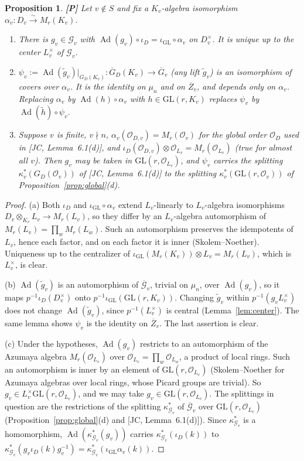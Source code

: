 \documentclass[12pt]{article}
\newcommand{\ov}[1]{\overline{#1}}
\newcommand{\cO}{\mathcal{O}}
\newcommand{\Ad}{\operatorname{Ad}}
\newcommand{\GL}{\mathrm{GL}}
\newcommand{\Gb}{\ov{G}}
\newcommand{\Zb}{\ov{Z}}
\newcommand{\GDb}{\ov{G}_D}
\newcommand{\ks}{\kappa^{*}}
\newcommand{\cG}{\mathcal{G}}
\newcommand{\cGb}{\ov{\mathcal{G}}}
\newcommand{\iD}{\iota_D}
\newcommand{\iG}{\iota_{\GL}}
\newcommand{\Pv}{\textbf{[P]}}
\theoremstyle{plain}
\newtheorem{proposition}[theorem]{Proposition}
\theoremstyle{definition}
\begin{document}
\begin{proposition}\label{prop:outsideS}\Pv
Let $v\notin S$ and fix a $K_v$-algebra isomorphism $\alpha_v:D_v\xrightarrow{\sim}M_r(K_v)$.
\begin{enumerate}[label=(\alph*)]
\item There is $g_v\in\cG_v$ with $\Ad(g_v)\circ\iD=\iG\circ\alpha_v$ on $D_v^\times$. It is unique up to the center $L_v^\times$ of $\cG_v$.
\item $\psi_v:=\Ad(\tilde g_v)|_{\GDb(K_v)}:\GDb(K_v)\to\Gb_v$ (any lift $\tilde g_v$) is an isomorphism of covers over $\alpha_v$. It is the identity on $\mu_n$ and on $\Zb_v$, and depends only on $\alpha_v$. Replacing $\alpha_v$ by $\Ad(h)\circ\alpha_v$ with $h\in\GL(r,K_v)$ replaces $\psi_v$ by $\Ad(\tilde h)\circ\psi_v$.
\item Suppose $v$ is finite, $v\nmid n$, $\alpha_v(\cO_{D,v})=M_r(\cO_v)$ for the global order $\cO_D$ used in [JC, Lemma~6.1(d)], and $\iD(\cO_{D,v})\otimes\cO_{L_v}=M_r(\cO_{L_v})$ (true for almost all $v$). Then $g_v$ may be taken in $\GL(r,\cO_{L_v})$, and $\psi_v$ carries the splitting $\ks_v(G_D(\cO_v))$ of [JC, Lemma~6.1(d)] to the splitting $\ks_v(\GL(r,\cO_v))$ of Proposition~\ref{prop:global}(d).
\end{enumerate}
\end{proposition}
\begin{proof}
(a) Both $\iD$ and $\iG\circ\alpha_v$ extend $L_v$-linearly to $L_v$-algebra isomorphisms $D_v\otimes_{K_v}L_v\to M_r(L_v)$, so they differ by an $L_v$-algebra automorphism of $M_r(L_v)=\prod_wM_r(L_w)$. Such an automorphism preserves the idempotents of $L_v$, hence each factor, and on each factor it is inner (Skolem--Noether). Uniqueness up to the centralizer of $\iG(M_r(K_v))\otimes L_v=M_r(L_v)$, which is $L_v^\times$, is clear.

(b) $\Ad(\tilde g_v)$ is an automorphism of $\cGb_v$, trivial on $\mu_n$, over $\Ad(g_v)$, so it maps $p^{-1}\iD(D_v^\times)$ onto $p^{-1}\iG(\GL(r,K_v))$. Changing $\tilde g_v$ within $p^{-1}(g_vL_v^\times)$ does not change $\Ad(\tilde g_v)$, since $p^{-1}(L_v^\times)$ is central (Lemma~\ref{lem:center}). The same lemma shows $\psi_v$ is the identity on $\Zb_v$. The last assertion is clear.

(c) Under the hypotheses, $\Ad(g_v)$ restricts to an automorphism of the Azumaya algebra $M_r(\cO_{L_v})$ over $\cO_{L_v}=\prod_w\cO_{L_w}$, a product of local rings. Such an automorphism is inner by an element of $\GL(r,\cO_{L_v})$ (Skolem--Noether for Azumaya algebras over local rings, whose Picard groups are trivial). So $g_v\in L_v^\times\GL(r,\cO_{L_v})$, and we may take $g_v\in\GL(r,\cO_{L_v})$. The splittings in question are the restrictions of the splitting $\ks_{\cG_v}$ of $\cGb_v$ over $\GL(r,\cO_{L_v})$ (Proposition~\ref{prop:global}(d) and [JC, Lemma~6.1(d)]). Since $\ks_{\cG_v}$ is a homomorphism, $\Ad(\ks_{\cG_v}(g_v))$ carries $\ks_{\cG_v}(\iD(k))$ to $\ks_{\cG_v}(g_v\iD(k)g_v^{-1})=\ks_{\cG_v}(\iG\alpha_v(k))$.
\end{proof}
\end{document}
